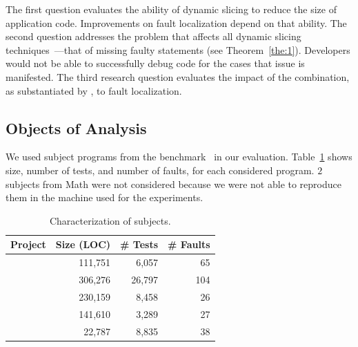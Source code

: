\documentclass{article}
\begin{document}
The first question evaluates the ability of dynamic slicing to reduce
the size of application code. Improvements on fault localization
depend on that ability. The second question addresses the problem that
affects all dynamic slicing
techniques~\cite{Lin:2018:BDE:3238147.3238163}---that of missing
faulty statements (see Theorem~\ref{the:1}). Developers would
not be able to successfully debug code for the cases that issue is
manifested. The third research question evaluates the impact of the
combination, as substantiated by \comb, to fault localization.


%
%
\subsection{Objects of Analysis}\label{sec:analysis}


We used subject programs from the \dfj{}
benchmark~\cite{just-defects4j-issta2014} in our evaluation.
Table~\ref{tab:df4j} shows size, number of tests, and number of
faults, for each considered program. $2$ subjects from Math
were not considered because we were not able to reproduce them
in the machine used for the experiments.

\begin{table}[h]
  \small
  \centering
  \setlength{\tabcolsep}{4pt}
  \begin{tabular}{lrrr}
    \toprule
    Project            & Size (LOC) & \# Tests & \# Faults \\ %
    \midrule
    \lang{}            & 111,751  & 6,057 & 65       \\   %
    \cmath{}           & 306,276  & 26,797 & 104     \\   %
    \chart{}           & 230,159  & 8,458 & 26      \\  %
    \jtime{}           & 141,610  & 3,289 & 27       \\   %
    \mockito{}         & 22,787  & 8,835 & 38    \\     %
    \bottomrule
  \end{tabular}
  \caption {Characterization of \dfj{} subjects.}
  \label{tab:df4j}
\end{table}
\normalsize
\end{document}
